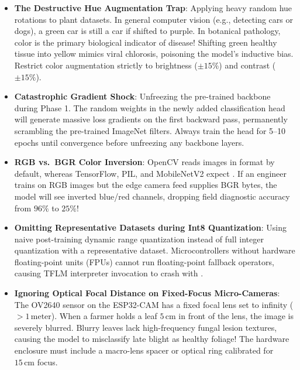 \begin{warning}
\begin{itemize}
    \item \textbf{The Destructive Hue Augmentation Trap}:
    Applying heavy random hue rotations to plant datasets. In general computer vision (e.g., detecting cars or dogs), a green car is still a car if shifted to purple. In botanical pathology, color is the primary biological indicator of disease! Shifting green healthy tissue into yellow mimics viral chlorosis, poisoning the model's inductive bias. Restrict color augmentation strictly to brightness ($\pm 15\%$) and contrast ($\pm 15\%$).
    \item \textbf{Catastrophic Gradient Shock}:
    Unfreezing the pre-trained backbone during Phase 1. The random weights in the newly added classification head will generate massive loss gradients on the first backward pass, permanently scrambling the pre-trained ImageNet filters. Always train the head for 5--10 epochs until convergence before unfreezing any backbone layers.
    \item \textbf{RGB vs.\ BGR Color Inversion}:
    OpenCV reads images in  format by default, whereas TensorFlow, PIL, and MobileNetV2 expect . If an engineer trains on RGB images but the edge camera feed supplies BGR bytes, the model will see inverted blue/red channels, dropping field diagnostic accuracy from $96\%$ to $25\%$!
    \item \textbf{Omitting Representative Datasets during Int8 Quantization}:
    Using naive post-training dynamic range quantization instead of full integer quantization with a representative dataset. Microcontrollers without hardware floating-point units (FPUs) cannot run floating-point fallback operators, causing TFLM interpreter invocation to crash with .
    \item \textbf{Ignoring Optical Focal Distance on Fixed-Focus Micro-Cameras}:
    The OV2640 sensor on the ESP32-CAM has a fixed focal lens set to infinity ($> 1\,\text{meter}$). When a farmer holds a leaf $5\,\text{cm}$ in front of the lens, the image is severely blurred. Blurry leaves lack high-frequency fungal lesion textures, causing the model to misclassify late blight as healthy foliage! The hardware enclosure must include a macro-lens spacer or optical ring calibrated for $15\,\text{cm}$ focus.
\end{itemize}
\end{warning}

